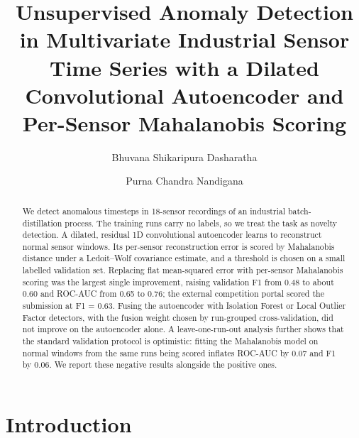 \documentclass[runningheads]{llncs}
\begin{document}
\title{Unsupervised Anomaly Detection in Multivariate Industrial Sensor Time Series with a Dilated Convolutional Autoencoder and Per-Sensor Mahalanobis Scoring}

\author{Bhuvana Shikaripura Dasharatha \and Purna Chandra Nandigana}


\maketitle

\begin{abstract}
We detect anomalous timesteps in 18-sensor recordings of an industrial batch-distillation process. The training runs carry no labels, so we treat the task as novelty detection. A dilated, residual 1D convolutional autoencoder learns to reconstruct normal sensor windows. Its per-sensor reconstruction error is scored by Mahalanobis distance under a Ledoit--Wolf covariance estimate, and a threshold is chosen on a small labelled validation set. Replacing flat mean-squared error with per-sensor Mahalanobis scoring was the largest single improvement, raising validation F1 from 0.48 to about 0.60 and ROC-AUC from 0.65 to 0.76; the external competition portal scored the submission at F1 = 0.63. Fusing the autoencoder with Isolation Forest or Local Outlier Factor detectors, with the fusion weight chosen by run-grouped cross-validation, did not improve on the autoencoder alone. A leave-one-run-out analysis further shows that the standard validation protocol is optimistic: fitting the Mahalanobis model on normal windows from the same runs being scored inflates ROC-AUC by 0.07 and F1 by 0.06. We report these negative results alongside the positive ones.

\end{abstract}

\section{Introduction}
\end{document}

